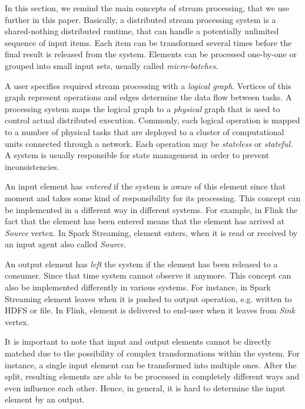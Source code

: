 In this section, we remind the main concepts of stream processing, that we use further in this paper. Basically, a distributed stream processing system is a shared-nothing distributed runtime, that can handle a potentially unlimited sequence of input items. Each item can be transformed several times before the final result is released from the system. Elements can be processed one-by-one or grouped into small input sets, usually called {\em micro-batches}. 

A user specifies required stream processing with a {\em logical graph}. Vertices of this graph represent operations and edges determine the data flow between tasks. A processing system maps the logical graph to a {\em physical} graph that is used to control actual distributed execution. Commonly, each logical operation is mapped to a number of physical tasks that are deployed to a cluster of computational units connected through a network. Each operation may be {\em stateless} or {\em stateful}. A system is usually responsible for state management in order to prevent inconsistencies.

An input element has {\em entered} if the system is aware of this element since that moment and takes some kind of responsibility for its processing. This concept can be implemented in a different way in different systems. For example, in Flink the fact that the element has been entered means that the element has arrived at {\em Source} vertex. In Spark Streaming, element enters, when it is read or received by an input agent also called {\em Source}. 

An output element has {\em left} the system if the element has been released to a consumer. Since that time system cannot observe it anymore. This concept can also be implemented differently in various systems. For instance, in Spark Streaming element leaves when it is pushed to output operation, e.g. written to HDFS or file. In Flink, element is delivered to end-user when it leaves from {\em Sink} vertex.   

It is important to note that input and output elements cannot be directly matched due to the possibility of complex transformations within the system. For instance, a single input element can be transformed into multiple ones. After the split, resulting elements are able to be processed in completely different ways and even influence each other. Hence, in general, it is hard to determine the input element by an output.